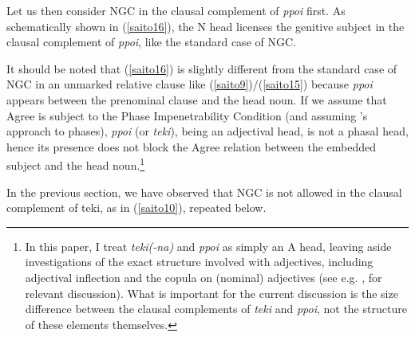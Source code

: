 \documentclass[output=paper]{langscibook}
\begin{document}
\begin{exe}
\ex \label{saito15}
\end{exe}

Let us then consider NGC in the clausal complement of \emph{ppoi} first. As schematically shown in (\ref{saito16}), the N head licenses the genitive subject in the clausal complement of \emph{ppoi}, like the standard case of NGC.

\begin{exe}
\ex \label{saito16}
\end{exe}

It should be noted that (\ref{saito16}) is slightly different from the standard case of NGC in an unmarked relative clause like (\ref{saito9})/(\ref{saito15}) because \emph{ppoi} appears between the prenominal clause and the head noun. If we assume that Agree is subject to the Phase Impenetrability Condition (and assuming \citealt{Chomsky2000,Chomsky2001}'s approach to phases), \emph{ppoi} (or \emph{teki}), being an adjectival head, is not a phasal head, hence its presence does not block the Agree relation between the embedded subject and the head noun.\footnote{In this paper, I treat \emph{teki(-na)} and \emph{ppoi} as simply an A head, leaving aside investigations of the exact structure involved with adjectives, including adjectival inflection and the copula on (nominal) adjectives (see e.g. \citealt{nishiyama1999}, \citealt{Yamakido2005,Yamakido2013} for relevant discussion). What is important for the current discussion is the size difference between the clausal complements of \emph{teki} and \emph{ppoi}, not the structure of these elements themselves.}

In the previous section, we have observed that NGC is not allowed in the clausal complement of teki, as in (\ref{saito10}), repeated below. 
\end{document}
